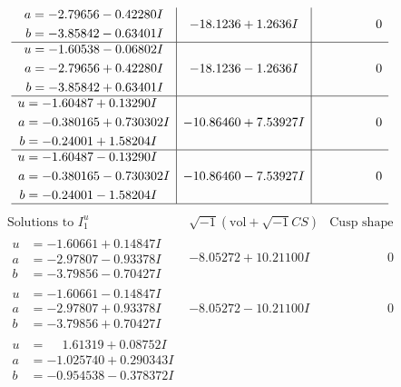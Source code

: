 \documentclass[1p]{elsarticle_modified}
\theoremstyle{definition}
\newcommand{\I}{\sqrt{-1}}
\begin{document}
$$\begin{array}{c|c|c}
\begin{aligned}
a &= -2.79656 - 0.42280 I \\
b &= -3.85842 - 0.63401 I\end{aligned}
 & -18.1236 + 1.2636 I & \phantom{-0.000000 } 0 \\ \hline\begin{aligned}
u &= -1.60538 - 0.06802 I \\
a &= -2.79656 + 0.42280 I \\
b &= -3.85842 + 0.63401 I\end{aligned}
 & -18.1236 - 1.2636 I & \phantom{-0.000000 } 0 \\ \hline\begin{aligned}
u &= -1.60487 + 0.13290 I \\
a &= -0.380165 + 0.730302 I \\
b &= -0.24001 + 1.58204 I\end{aligned}
 & -10.86460 + 7.53927 I & \phantom{-0.000000 } 0 \\ \hline\begin{aligned}
u &= -1.60487 - 0.13290 I \\
a &= -0.380165 - 0.730302 I \\
b &= -0.24001 - 1.58204 I\end{aligned}
 & -10.86460 - 7.53927 I & \phantom{-0.000000 } 0\\
 \hline 
 \end{array}$$\newpage$$\begin{array}{c|c|c}  
\text{Solutions to }I^u_{1}& \I (\text{vol} + \sqrt{-1}CS) & \text{Cusp shape}\\
 \hline 
\begin{aligned}
u &= -1.60661 + 0.14847 I \\
a &= -2.97807 - 0.93378 I \\
b &= -3.79856 - 0.70427 I\end{aligned}
 & -8.05272 + 10.21100 I & \phantom{-0.000000 } 0 \\ \hline\begin{aligned}
u &= -1.60661 - 0.14847 I \\
a &= -2.97807 + 0.93378 I \\
b &= -3.79856 + 0.70427 I\end{aligned}
 & -8.05272 - 10.21100 I & \phantom{-0.000000 } 0 \\ \hline\begin{aligned}
u &= \phantom{-}1.61319 + 0.08752 I \\
a &= -1.025740 + 0.290343 I \\
b &= -0.954538 - 0.378372 I\end{aligned}

\end{array}$$
\end{document}
